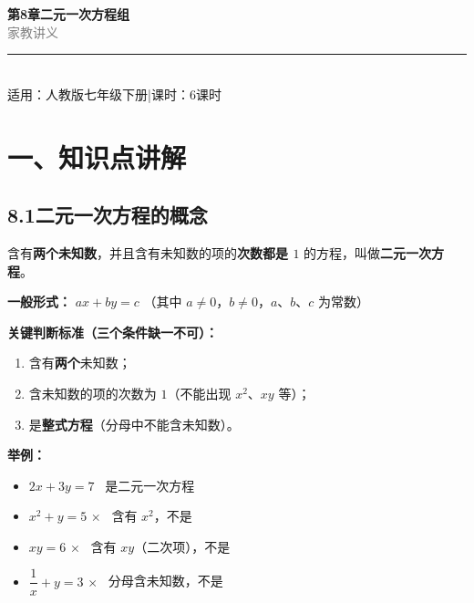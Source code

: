 \documentclass[12pt, a4paper]{ctexart}
\begin{document}
\begin{center}
{\Huge\bfseries\textcolor{mainblue}{第8章\quad 二元一次方程组}}\\[12pt]
{\Large\textcolor{gray}{家\quad 教\quad 讲\quad 义}}\\[8pt]
\rule{0.6\textwidth}{1pt}\\[8pt]
{\normalsize 适用：人教版\quad 七年级下册\quad |\quad 课时：6课时}
\end{center}
\vspace{10pt}

\section*{\textcolor{mainblue}{一、知识点讲解}}

\subsection*{8.1\quad 二元一次方程的概念}

\begin{knowledgebox}[二元一次方程]
含有\textbf{两个未知数}，并且含有未知数的项的\textbf{次数都是 $1$} 的方程，叫做\textbf{二元一次方程}。

\medskip
\textbf{一般形式：} $ax + by = c$ \quad（其中 $a \neq 0$，$b \neq 0$，$a$、$b$、$c$ 为常数）

\medskip
\textbf{关键判断标准（三个条件缺一不可）：}
\begin{enumerate}[leftmargin=1.5em]
  \item 含有\textbf{两个}未知数；
  \item 含未知数的项的次数为 $1$（不能出现 $x^2$、$xy$ 等）；
  \item 是\textbf{整式方程}（分母中不能含未知数）。
\end{enumerate}

\medskip
\textbf{举例：}
\begin{itemize}[leftmargin=1.5em]
  \item $2x + 3y = 7$ \quad \checkmark \ 是二元一次方程
  \item $x^2 + y = 5$ \quad $\times$ \ 含有 $x^2$，不是
  \item $xy = 6$ \quad $\times$ \ 含有 $xy$（二次项），不是
  \item $\dfrac{1}{x} + y = 3$ \quad $\times$ \ 分母含未知数，不是
\end{itemize}
\end{knowledgebox}
\end{document}

